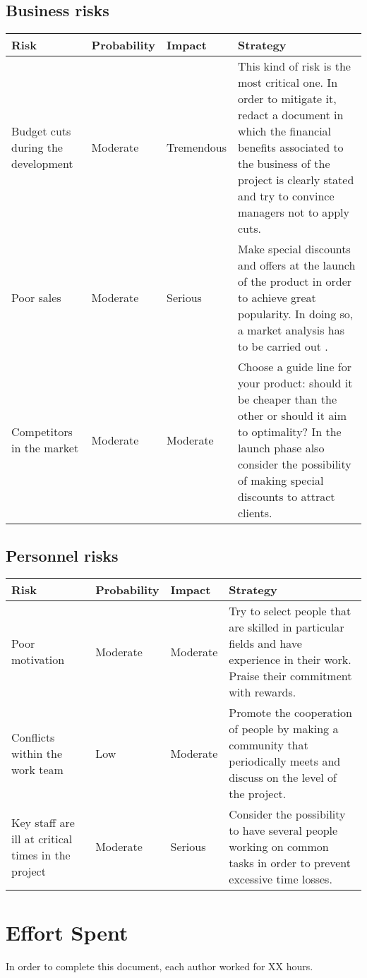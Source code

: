 \documentclass[11pt,a4paper]{report}
\begin{document}
\section{Business risks}
    \begin{tabularx}{\textwidth}{ |p{3cm}|p{1.8cm}|p{1.85cm}|X|}
    \hline
    Risk & Probability & Impact & Strategy \\ \hline
    Budget cuts during the development & Moderate & Tremendous & This kind of risk is the most critical one. In order to mitigate it, redact a document in which the financial benefits associated to the business of the project is clearly stated and try to convince managers not to apply cuts. \\ \hline
    Poor sales & Moderate & Serious & Make special discounts and offers at the launch of the product in order to achieve great popularity. In doing so, a market analysis has to be carried out . \\ \hline
    Competitors in the market & Moderate & Moderate & Choose a guide line for your product: should it be cheaper than the other or should it aim to optimality? In the launch phase also consider the possibility of making special discounts to attract clients. \\ \hline
    \end{tabularx}
\section{Personnel risks}
    \begin{tabularx}{\textwidth}{ |p{3cm}|p{1.8cm}|p{1.85cm}|X|}
    \hline
    Risk & Probability & Impact & Strategy \\ \hline
    Poor motivation & Moderate & Moderate & Try to select people that are skilled in particular fields and have experience in their work. Praise their commitment with rewards. \\ \hline
    Conflicts within the work team & Low & Moderate & Promote the cooperation of people by making a community that periodically meets and discuss on the level of the project. \\ \hline
    Key staff are ill at critical times in the project & Moderate & Serious & Consider the possibility to have several people working on common tasks in order to prevent excessive time losses.\\
    \hline
    \end{tabularx}
\chapter{Effort Spent}
In order to complete this document, each author worked for XX hours.
\end{document}
